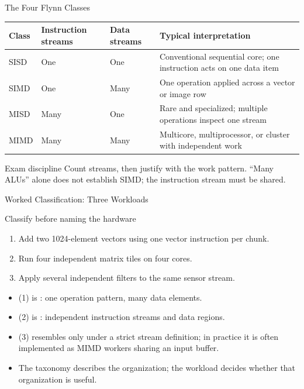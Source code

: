 \documentclass[aspectratio=169]{beamer}
\begin{document}
\begin{frame}{The Four Flynn Classes}
  \scriptsize
  \begin{center}
    \begin{tabular}{@{}p{1.5cm}p{2.9cm}p{2.9cm}p{4.3cm}@{}}
      \toprule
      \textbf{Class} & \textbf{Instruction streams} & \textbf{Data streams} & \textbf{Typical interpretation} \\
      \midrule
      SISD & One & One & Conventional sequential core; one instruction acts on one data item \\
      SIMD & One & Many & One operation applied across a vector or image row \\
      MISD & Many & One & Rare and specialized; multiple operations inspect one stream \\
      MIMD & Many & Many & Multicore, multiprocessor, or cluster with independent work \\
      \bottomrule
    \end{tabular}
  \end{center}
  \vspace{0.15cm}
  \begin{alertblock}{Exam discipline}
    Count streams, then justify with the work pattern. ``Many ALUs'' alone does
    not establish SIMD; the instruction stream must be shared.
  \end{alertblock}
\end{frame}

\begin{frame}{Worked Classification: Three Workloads}
  \begin{exampleblock}{Classify before naming the hardware}
    \begin{enumerate}
      \item Add two 1024-element vectors using one vector instruction per chunk.
      \item Run four independent matrix tiles on four cores.
      \item Apply several independent filters to the same sensor stream.
    \end{enumerate}
  \end{exampleblock}
  \begin{itemize}
    \item (1) is : one operation pattern, many data elements.
    \item (2) is : independent instruction streams and data regions.
    \item (3) resembles  only under a strict stream definition; in
      practice it is often implemented as MIMD workers sharing an input buffer.
    \item The taxonomy describes the organization; the workload decides whether
      that organization is useful.
  \end{itemize}
\end{frame}
\end{document}
